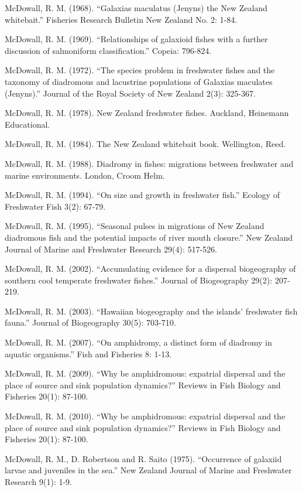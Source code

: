 \documentclass[]{book}
\begin{document}
McDowall, R. M. (1968). ``Galaxias maculatus (Jenyns) the New Zealand
whitebait.'' Fisheries Research Bulletin New Zealand No. 2: 1-84.

McDowall, R. M. (1969). ``Relationships of galaxioid fishes with a
further discussion of salmoniform classification.'' Copeia: 796-824.

McDowall, R. M. (1972). ``The species problem in freshwater fishes and
the taxonomy of diadromous and lacustrine populations of Galaxias
maculates (Jenyns).'' Journal of the Royal Society of New Zealand 2(3):
325-367.

McDowall, R. M. (1978). New Zealand freshwater fishes. Auckland,
Heinemann Educational.

McDowall, R. M. (1984). The New Zealand whitebait book. Wellington,
Reed.

McDowall, R. M. (1988). Diadromy in fishes: migrations between
freshwater and marine environments. London, Croom Helm.

McDowall, R. M. (1994). ``On size and growth in freshwater fish.''
Ecology of Freshwater Fish 3(2): 67-79.

McDowall, R. M. (1995). ``Seasonal pulses in migrations of New Zealand
diadromous fish and the potential impacts of river mouth closure.'' New
Zealand Journal of Marine and Freshwater Research 29(4): 517-526.

McDowall, R. M. (2002). ``Accumulating evidence for a dispersal
biogeography of southern cool temperate freshwater fishes.'' Journal of
Biogeography 29(2): 207-219.

McDowall, R. M. (2003). ``Hawaiian biogeography and the islands'
freshwater fish fauna.'' Journal of Biogeography 30(5): 703-710.

McDowall, R. M. (2007). ``On amphidromy, a distinct form of diadromy in
aquatic organisms.'' Fish and Fisheries 8: 1-13.

McDowall, R. M. (2009). ``Why be amphidromous: expatrial dispersal and
the place of source and sink population dynamics?'' Reviews in Fish
Biology and Fisheries 20(1): 87-100.

McDowall, R. M. (2010). ``Why be amphidromous: expatrial dispersal and
the place of source and sink population dynamics?'' Reviews in Fish
Biology and Fisheries 20(1): 87-100.

McDowall, R. M., D. Robertson and R. Saito (1975). ``Occurrence of
galaxiid larvae and juveniles in the sea.'' New Zealand Journal of
Marine and Freshwater Research 9(1): 1-9.
\end{document}
